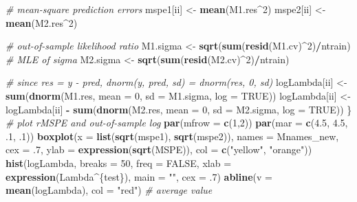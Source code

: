 \documentclass[]{article}
\newenvironment{Shaded}{\begin{snugshade}}{\end{snugshade}}
\newcommand{\KeywordTok}[1]{\textcolor[rgb]{0.13,0.29,0.53}{\textbf{#1}}}
\newcommand{\DataTypeTok}[1]{\textcolor[rgb]{0.13,0.29,0.53}{#1}}
\newcommand{\DecValTok}[1]{\textcolor[rgb]{0.00,0.00,0.81}{#1}}
\newcommand{\FloatTok}[1]{\textcolor[rgb]{0.00,0.00,0.81}{#1}}
\newcommand{\StringTok}[1]{\textcolor[rgb]{0.31,0.60,0.02}{#1}}
\newcommand{\CommentTok}[1]{\textcolor[rgb]{0.56,0.35,0.01}{\textit{#1}}}
\newcommand{\OtherTok}[1]{\textcolor[rgb]{0.56,0.35,0.01}{#1}}
\newcommand{\OperatorTok}[1]{\textcolor[rgb]{0.81,0.36,0.00}{\textbf{#1}}}
\newcommand{\NormalTok}[1]{#1}
\begin{document}
\begin{Shaded}
\begin{Highlighting}[]
\CommentTok{# mean-square prediction errors}
\NormalTok{  mspe1[ii] <-}\StringTok{ }\KeywordTok{mean}\NormalTok{(M1.res}\OperatorTok{^}\DecValTok{2}\NormalTok{)}
\NormalTok{  mspe2[ii] <-}\StringTok{ }\KeywordTok{mean}\NormalTok{(M2.res}\OperatorTok{^}\DecValTok{2}\NormalTok{)}

\CommentTok{# out-of-sample likelihood ratio}
\NormalTok{  M1.sigma <-}\StringTok{ }\KeywordTok{sqrt}\NormalTok{(}\KeywordTok{sum}\NormalTok{(}\KeywordTok{resid}\NormalTok{(M1.cv)}\OperatorTok{^}\DecValTok{2}\NormalTok{)}\OperatorTok{/}\NormalTok{ntrain) }\CommentTok{# MLE of sigma}
\NormalTok{  M2.sigma <-}\StringTok{ }\KeywordTok{sqrt}\NormalTok{(}\KeywordTok{sum}\NormalTok{(}\KeywordTok{resid}\NormalTok{(M2.cv)}\OperatorTok{^}\DecValTok{2}\NormalTok{)}\OperatorTok{/}\NormalTok{ntrain)}

\CommentTok{# since res = y - pred, dnorm(y, pred, sd) = dnorm(res, 0, sd)}
\NormalTok{  logLambda[ii] <-}\StringTok{ }\KeywordTok{sum}\NormalTok{(}\KeywordTok{dnorm}\NormalTok{(M1.res, }\DataTypeTok{mean =} \DecValTok{0}\NormalTok{, }\DataTypeTok{sd =}\NormalTok{ M1.sigma, }\DataTypeTok{log =} \OtherTok{TRUE}\NormalTok{))}
\NormalTok{  logLambda[ii] <-}\StringTok{ }\NormalTok{logLambda[ii] }\OperatorTok{-}\StringTok{ }\KeywordTok{sum}\NormalTok{(}\KeywordTok{dnorm}\NormalTok{(M2.res, }\DataTypeTok{mean =} \DecValTok{0}\NormalTok{, }\DataTypeTok{sd =}\NormalTok{ M2.sigma, }\DataTypeTok{log =} \OtherTok{TRUE}\NormalTok{))}
\NormalTok{\}}
\CommentTok{# plot rMSPE and out-of-sample log}
\KeywordTok{par}\NormalTok{(}\DataTypeTok{mfrow =} \KeywordTok{c}\NormalTok{(}\DecValTok{1}\NormalTok{,}\DecValTok{2}\NormalTok{))}
\KeywordTok{par}\NormalTok{(}\DataTypeTok{mar =} \KeywordTok{c}\NormalTok{(}\FloatTok{4.5}\NormalTok{, }\FloatTok{4.5}\NormalTok{, .}\DecValTok{1}\NormalTok{, .}\DecValTok{1}\NormalTok{))}
\KeywordTok{boxplot}\NormalTok{(}\DataTypeTok{x =} \KeywordTok{list}\NormalTok{(}\KeywordTok{sqrt}\NormalTok{(mspe1), }\KeywordTok{sqrt}\NormalTok{(mspe2)),}
        \DataTypeTok{names =}\NormalTok{ Mnames_new, }\DataTypeTok{cex =}\NormalTok{ .}\DecValTok{7}\NormalTok{,}
        \DataTypeTok{ylab =} \KeywordTok{expression}\NormalTok{(}\KeywordTok{sqrt}\NormalTok{(MSPE)), }\DataTypeTok{col =} \KeywordTok{c}\NormalTok{(}\StringTok{"yellow"}\NormalTok{, }\StringTok{"orange"}\NormalTok{))}
\KeywordTok{hist}\NormalTok{(logLambda, }\DataTypeTok{breaks =} \DecValTok{50}\NormalTok{, }\DataTypeTok{freq =} \OtherTok{FALSE}\NormalTok{,}
     \DataTypeTok{xlab =} \KeywordTok{expression}\NormalTok{(Lambda}\OperatorTok{^}\NormalTok{\{test\}),}
     \DataTypeTok{main =} \StringTok{""}\NormalTok{, }\DataTypeTok{cex =}\NormalTok{ .}\DecValTok{7}\NormalTok{)}
\KeywordTok{abline}\NormalTok{(}\DataTypeTok{v =} \KeywordTok{mean}\NormalTok{(logLambda), }\DataTypeTok{col =} \StringTok{"red"}\NormalTok{) }\CommentTok{# average value }
\end{Highlighting}
\end{Shaded}
\end{document}
